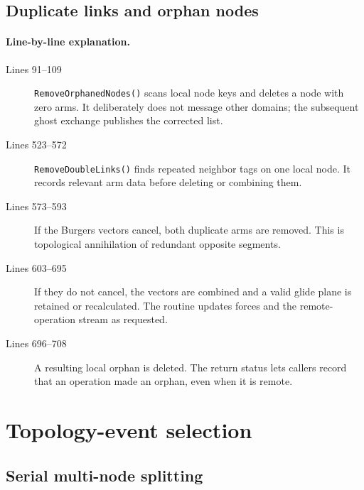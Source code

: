 \documentclass[11pt]{article}
\newcommand{\code}[1]{\texorpdfstring{\nolinkurl{#1}}{#1}}
\begin{document}
\subsection{Duplicate links and orphan nodes}





\paragraph{Line-by-line explanation.}
\begin{description}
\item[Lines 91--109] \code{RemoveOrphanedNodes()} scans local node keys and
deletes a node with zero arms. It deliberately does not message other
domains; the subsequent ghost exchange publishes the corrected list.
\item[Lines 523--572] \code{RemoveDoubleLinks()} finds repeated neighbor tags
on one local node. It records relevant arm data before deleting or combining
them.
\item[Lines 573--593] If the Burgers vectors cancel, both duplicate arms are
removed. This is topological annihilation of redundant opposite segments.
\item[Lines 603--695] If they do not cancel, the vectors are combined and a
valid glide plane is retained or recalculated. The routine updates forces and
the remote-operation stream as requested.
\item[Lines 696--708] A resulting local orphan is deleted. The return status
lets callers record that an operation made an orphan, even when it is remote.
\end{description}

\section{Topology-event selection}

\subsection{Serial multi-node splitting}


\end{document}
